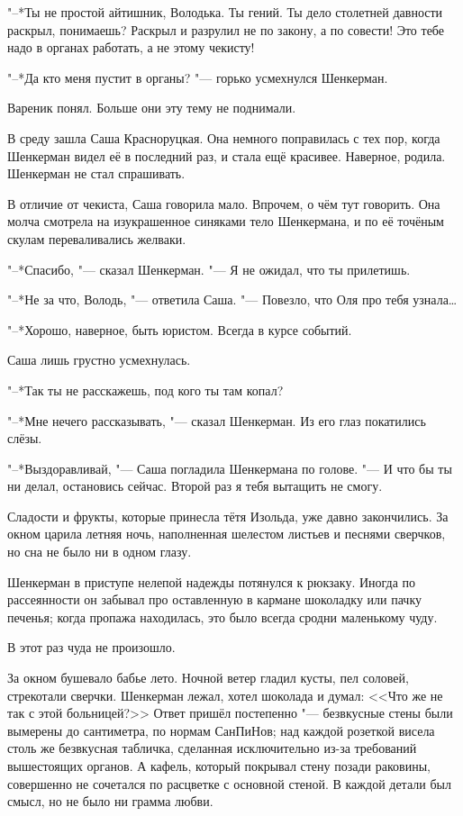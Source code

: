 "--*Ты не простой айтишник, Володька.
Ты гений.
Ты дело столетней давности раскрыл, понимаешь?
Раскрыл и разрулил не по закону, а по совести!
Это тебе надо в органах работать, а не этому чекисту!

"--*Да кто меня пустит в органы? "--- горько усмехнулся Шенкерман.

Вареник понял.
Больше они эту тему не поднимали.

\label{Wed_2012_09_05}

В среду зашла Саша Красноруцкая.
Она немного поправилась с тех пор, когда Шенкерман видел её в последний раз, и стала ещё красивее.
Наверное, родила.
Шенкерман не стал спрашивать.

В отличие от чекиста, Саша говорила мало.
Впрочем, о чём тут говорить.
Она молча смотрела на изукрашенное синяками тело Шенкермана, и по её точёным скулам переваливались желваки.

"--*Спасибо, "--- сказал Шенкерман.
"--- Я не ожидал, что ты прилетишь.

"--*Не за что, Володь, "--- ответила Саша.
"--- Повезло, что Оля про тебя узнала\ldots{}

"--*Хорошо, наверное, быть юристом.
Всегда в курсе событий.

Саша лишь грустно усмехнулась.

"--*Так ты не расскажешь, под кого ты там копал?

"--*Мне нечего рассказывать, "--- сказал Шенкерман.
Из его глаз покатились слёзы.

"--*Выздоравливай, "--- Саша погладила Шенкермана по голове.
"--- И что бы ты ни делал, остановись сейчас.
Второй раз я тебя вытащить не смогу.

Сладости и фрукты, которые принесла тётя Изольда, уже давно закончились.
За окном царила летняя ночь, наполненная шелестом листьев и песнями сверчков, но сна не было ни в одном глазу.

Шенкерман в приступе нелепой надежды потянулся к рюкзаку.
Иногда по рассеянности он забывал про оставленную в кармане шоколадку или пачку печенья;
когда пропажа находилась, это было всегда сродни маленькому чуду.

В этот раз чуда не произошло.

За окном бушевало бабье лето.
Ночной ветер гладил кусты, пел соловей, стрекотали сверчки.
Шенкерман лежал, хотел шоколада и думал: <<Что же не так с этой больницей?>>
Ответ пришёл постепенно "--- безвкусные стены были вымерены до сантиметра, по нормам СанПиНов;
над каждой розеткой висела столь же безвкусная табличка, сделанная исключительно из-за требований вышестоящих органов.
А кафель, который покрывал стену позади раковины, совершенно не сочетался по расцветке с основной стеной.
В каждой детали был смысл, но не было ни грамма любви.

